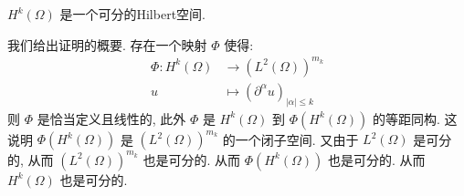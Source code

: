 \documentclass[11pt]{ctexart}[UTF8]
\begin{document}
\begin{property}
    $H^{k}(\Omega)$ 是一个可分的Hilbert空间.
\end{property}
我们给出证明的概要. 存在一个映射 $\Phi$ 使得:
\begin{equation*}
    \begin{aligned}
        \Phi: H^{k}(\Omega) &\longrightarrow (L^{2}(\Omega))^{m_{k}}\\
        u &\longmapsto (\partial^{\alpha}u)_{|\alpha| \leq k}
    \end{aligned}
\end{equation*}
则 $\Phi$ 是恰当定义且线性的, 此外 $\Phi$ 是 $H^{k}(\Omega)$ 到 $\Phi(H^{k}(\Omega))$ 的等距同构. 这说明 $\Phi(H^{k}(\Omega))$ 是 $(L^{2}(\Omega))^{m_{k}}$ 的一个闭子空间. 
又由于 $L^{2}(\Omega)$ 是可分的, 从而 $(L^{2}(\Omega))^{m_{k}}$ 也是可分的. 从而 $\Phi(H^{k}(\Omega))$ 也是可分的. 从而 $H^{k}(\Omega)$ 也是可分的.
\end{document}
